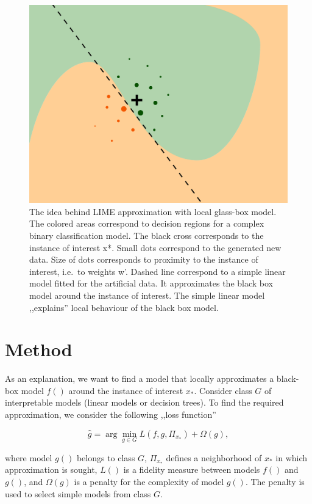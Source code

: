 \documentclass[]{krantz}
\begin{document}
\begin{figure}

{\centering \includegraphics[width=0.7\linewidth]{figure/lime_introduction} 

}

\caption{The idea behind LIME approximation with local glass-box model. The colored areas correspond to decision regions for a complex binary classification model. The black cross corresponds to the instance of interest x*. Small dots correspond to the generated new data. Size of dots corresponds to proximity to the instance of interest, i.e.~to weights w'. Dashed line correspond to a simple linear model fitted for the artificial data. It approximates the black box model around the instance of interest. The simple linear model ,,explains'' local behaviour of the black box model.}\label{fig:limeIntroduction}
\end{figure}

\hypertarget{LIMEMethod}{%
\section{Method}\label{LIMEMethod}}

As an explanation, we want to find a model that locally approximates a black-box model \(f()\) around the instance of interest \(x_*\). Consider class \(G\) of interpretable models (linear models or decision trees). To find the required approximation, we consider the following ,,loss function''

\[
\hat g = \arg \min_{g \in G} L(f, g, \Pi_{x_*}) + \Omega (g), 
\]

where model \(g()\) belongs to class \(G\), \(\Pi_{x_*}\) defines a neighborhood of \(x_*\) in which approximation is sought, \(L()\) is a fidelity measure between models \(f()\) and \(g()\), and \(\Omega(g)\) is a penalty for the complexity of model \(g()\). The penalty is used to select simple models from class \(G\).
\end{document}
